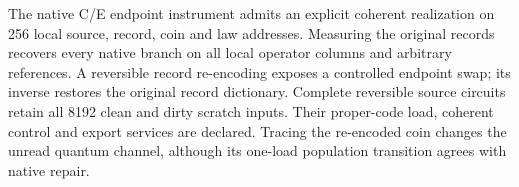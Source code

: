 The native C/E endpoint instrument admits an explicit coherent realization
on 256 local source, record, coin and law addresses.  Measuring the original
records recovers every native branch on all local operator columns and
arbitrary references.  A reversible record re-encoding exposes a controlled
endpoint swap; its inverse restores the original record dictionary.
Complete reversible source circuits retain all 8192 clean and dirty scratch
inputs.  Their proper-code load, coherent control and export services are
declared.  Tracing the re-encoded coin changes the unread quantum channel,
although its one-load population transition agrees with native repair.
